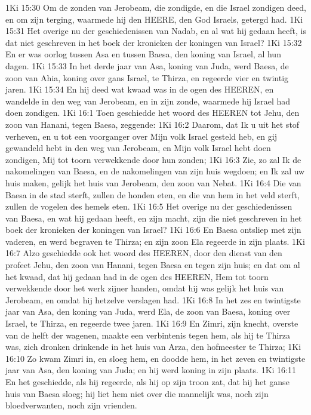 1Ki 15:30  Om de zonden van Jerobeam, die zondigde, en die Israel zondigen deed, en om zijn terging, waarmede hij den HEERE, den God Israels, getergd had.
1Ki 15:31  Het overige nu der geschiedenissen van Nadab, en al wat hij gedaan heeft, is dat niet geschreven in het boek der kronieken der koningen van Israel?
1Ki 15:32  En er was oorlog tussen Asa en tussen Baesa, den koning van Israel, al hun dagen.
1Ki 15:33  In het derde jaar van Asa, koning van Juda, werd Baesa, de zoon van Ahia, koning over gans Israel, te Thirza, en regeerde vier en twintig jaren.
1Ki 15:34  En hij deed wat kwaad was in de ogen des HEEREN, en wandelde in den weg van Jerobeam, en in zijn zonde, waarmede hij Israel had doen zondigen.
1Ki 16:1  Toen geschiedde het woord des HEEREN tot Jehu, den zoon van Hanani, tegen Baesa, zeggende:
1Ki 16:2  Daarom, dat Ik u uit het stof verheven, en u tot een voorganger over Mijn volk Israel gesteld heb, en gij gewandeld hebt in den weg van Jerobeam, en Mijn volk Israel hebt doen zondigen, Mij tot toorn verwekkende door hun zonden;
1Ki 16:3  Zie, zo zal Ik de nakomelingen van Baesa, en de nakomelingen van zijn huis wegdoen; en Ik zal uw huis maken, gelijk het huis van Jerobeam, den zoon van Nebat.
1Ki 16:4  Die van Baesa in de stad sterft, zullen de honden eten, en die van hem in het veld sterft, zullen de vogelen des hemels eten.
1Ki 16:5  Het overige nu der geschiedenissen van Baesa, en wat hij gedaan heeft, en zijn macht, zijn die niet geschreven in het boek der kronieken der koningen van Israel?
1Ki 16:6  En Baesa ontsliep met zijn vaderen, en werd begraven te Thirza; en zijn zoon Ela regeerde in zijn plaats.
1Ki 16:7  Alzo geschiedde ook het woord des HEEREN, door den dienst van den profeet Jehu, den zoon van Hanani, tegen Baesa en tegen zijn huis; en dat om al het kwaad, dat hij gedaan had in de ogen des HEEREN, Hem tot toorn verwekkende door het werk zijner handen, omdat hij was gelijk het huis van Jerobeam, en omdat hij hetzelve verslagen had.
1Ki 16:8  In het zes en twintigste jaar van Asa, den koning van Juda, werd Ela, de zoon van Baesa, koning over Israel, te Thirza, en regeerde twee jaren.
1Ki 16:9  En Zimri, zijn knecht, overste van de helft der wagenen, maakte een verbintenis tegen hem, als hij te Thirza was, zich dronken drinkende in het huis van Arza, den hofmeester te Thirza;
1Ki 16:10  Zo kwam Zimri in, en sloeg hem, en doodde hem, in het zeven en twintigste jaar van Asa, den koning van Juda; en hij werd koning in zijn plaats.
1Ki 16:11  En het geschiedde, als hij regeerde, als hij op zijn troon zat, dat hij het ganse huis van Baesa sloeg; hij liet hem niet over die mannelijk was, noch zijn bloedverwanten, noch zijn vrienden.
